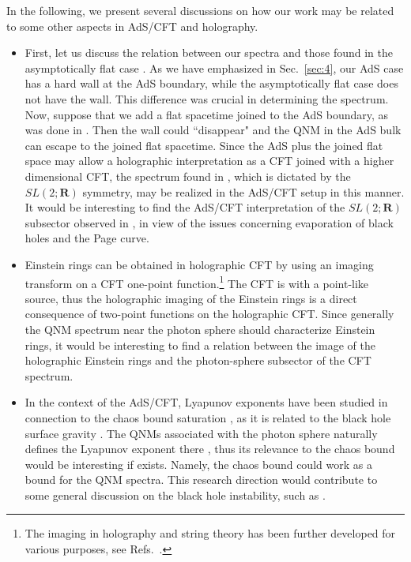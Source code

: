 \documentclass[a4paper,11pt]{article}
\begin{document}
In the following, we present several discussions on how our work may be related to some other aspects in AdS/CFT and holography.

\begin{itemize}
\item 
First, let us discuss the relation between our spectra and those found in the asymptotically flat case \cite{Hadar:2022xag}. As we have emphasized in Sec.~\ref{sec:4}, our AdS case has a hard wall at the AdS boundary, while the asymptotically flat case does not have the wall. This difference was crucial in determining the spectrum. Now, suppose that we add a flat spacetime joined to the AdS boundary, as was done in \cite{Almheiri:2019qdq}. Then the wall could ``disappear" and the QNM in the AdS bulk can escape to the joined flat spacetime. Since the AdS plus the joined flat space may allow a holographic interpretation as a CFT joined with a higher dimensional CFT, the spectrum found in \cite{Hadar:2022xag}, which is dictated by the $SL(2;\mathbf{R})$ symmetry, may be realized in the AdS/CFT setup in this manner. It would be interesting to find the AdS/CFT interpretation of the $SL(2;\mathbf{R})$ subsector observed in \cite{Hadar:2022xag}, in view of the issues concerning evaporation of black holes and the Page curve.

\item
Einstein rings can be obtained in holographic CFT \cite{Hashimoto:2018okj,Hashimoto:2019jmw} by using an imaging transform on a CFT one-point function.\footnote{The imaging in holography and string theory has been further developed for various purposes, see Refs.~\cite{Kaku:2021xqp,Liu:2022cev,Kaku:2022hcg,Hashimoto:2022ugt,Mandal:2022oma,Caron-Huot:2022lff,Hashimoto:2022aso,Zeng:2023zlf,Kinoshita:2023hgc}.}
The CFT is with a point-like source, thus the holographic imaging of the Einstein rings is a direct consequence of two-point functions on the holographic CFT. 
Since generally the QNM spectrum near the photon sphere should characterize Einstein rings, it would be interesting to find a relation between the image of the holographic Einstein rings and the photon-sphere subsector of the CFT spectrum.


\item
In the context of the AdS/CFT, Lyapunov exponents have been studied in connection to the chaos bound saturation \cite{Maldacena:2015waa}, as it is related to the black hole surface gravity \cite{Shenker:2013pqa,Engelsoy:2016xyb,Hashimoto:2016dfz}. The QNMs associated with the photon sphere naturally defines the Lyapunov exponent there \cite{Cardoso:2008bp}, thus its relevance to the chaos bound would be interesting if exists. Namely, the chaos bound could work as a bound for the QNM spectra. This research direction would contribute to some general discussion on the black hole instability, such as \cite{Bizon:2011gg}. 

\end{itemize}
\end{document}
